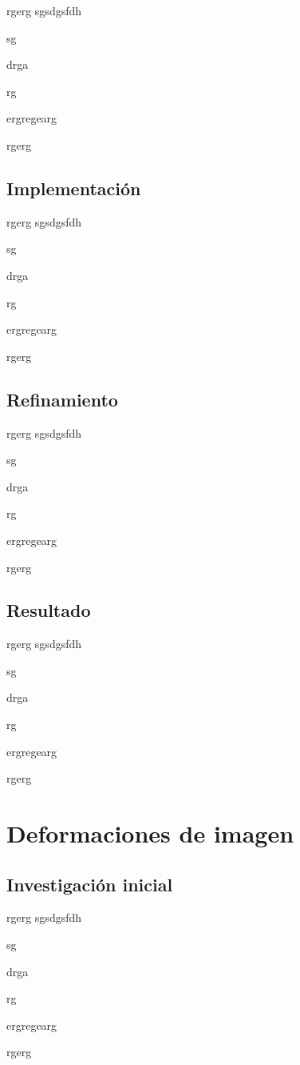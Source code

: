rgerg
sgsdgsfdh

sg

drga

rg

ergregearg

rgerg

\subsection{Implementación}

rgerg
sgsdgsfdh

sg

drga

rg

ergregearg

rgerg

\subsection{Refinamiento}

rgerg
sgsdgsfdh

sg

drga

rg

ergregearg

rgerg

\subsection{Resultado}

rgerg
sgsdgsfdh

sg

drga

rg

ergregearg

rgerg


\section{Deformaciones de imagen}

\subsection{Investigación inicial}

rgerg
sgsdgsfdh

sg

drga

rg

ergregearg

rgerg

